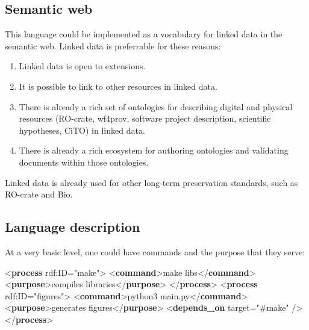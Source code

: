 \documentclass[manuscript,authordraft]{acmart}
\newenvironment{Shaded}{}{}
\newcommand{\KeywordTok}[1]{\textcolor[rgb]{0.00,0.44,0.13}{\textbf{#1}}}
\newcommand{\NormalTok}[1]{#1}
\newcommand{\OtherTok}[1]{\textcolor[rgb]{0.00,0.44,0.13}{#1}}
\newcommand{\StringTok}[1]{\textcolor[rgb]{0.25,0.44,0.63}{#1}}
\providecommand{\tightlist}{\setlength{\itemsep}{0pt}\setlength{\parskip}{0pt}}
\begin{document}
\hypertarget{semantic-web}{%
\subsection{Semantic web}\label{semantic-web}}

This language could be implemented as a vocabulary for linked data in
the semantic web. Linked data is preferrable for these reasons:

\begin{enumerate}
\def\labelenumi{\arabic{enumi}.}
\tightlist
\item
  Linked data is open to extensions.
\item
  It is possible to link to other resources in linked data.
\item
  There is already a rich set of ontologies for describing digital and
  physical resources (RO-crate, wf4prov, software project description,
  scientific hypotheses, CiTO) in linked data.
\item
  There is already a rich ecosystem for authoring ontologies and
  validating documents within those ontologies.
\end{enumerate}

Linked data is already used for other long-term preservation standards,
such as RO-crate and Bio.

\hypertarget{language-description}{%
\subsection{Language description}\label{language-description}}

At a very basic level, one could have commands and the purpose that they
serve:

\small

\begin{Shaded}
\begin{Highlighting}[]

\NormalTok{\textless{}}\KeywordTok{process}\OtherTok{ rdf:ID=}\StringTok{"make"}\NormalTok{\textgreater{}}
\NormalTok{  \textless{}}\KeywordTok{command}\NormalTok{\textgreater{}make libs\textless{}/}\KeywordTok{command}\NormalTok{\textgreater{}}
\NormalTok{  \textless{}}\KeywordTok{purpose}\NormalTok{\textgreater{}compiles libraries\textless{}/}\KeywordTok{purpose}\NormalTok{\textgreater{}}
\NormalTok{\textless{}/}\KeywordTok{process}\NormalTok{\textgreater{}}
\NormalTok{\textless{}}\KeywordTok{process}\OtherTok{ rdf:ID=}\StringTok{"figures"}\NormalTok{\textgreater{}}
\NormalTok{  \textless{}}\KeywordTok{command}\NormalTok{\textgreater{}python3 main.py\textless{}/}\KeywordTok{command}\NormalTok{\textgreater{}}
\NormalTok{  \textless{}}\KeywordTok{purpose}\NormalTok{\textgreater{}generates figures\textless{}/}\KeywordTok{purpose}\NormalTok{\textgreater{}}
\NormalTok{  \textless{}}\KeywordTok{depends\_on}\OtherTok{ target=}\StringTok{"\#make"}\NormalTok{ /\textgreater{}}
\NormalTok{\textless{}/}\KeywordTok{process}\NormalTok{\textgreater{}}
\end{Highlighting}
\end{Shaded}
\end{document}
